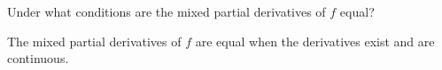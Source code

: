 Under what conditions are the mixed partial derivatives of $f$ equal?

\begin{solution}
    The mixed partial derivatives of $f$ are equal when the derivatives exist and are continuous.
\end{solution}